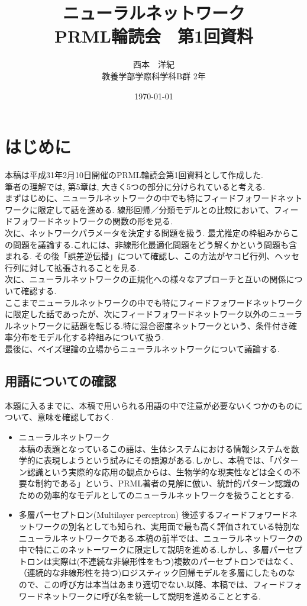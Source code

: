 \documentclass[11pt,a4paper]{jsarticle}
\begin{document}
\title{ニューラルネットワーク \\
PRML輪読会　第1回資料}
\author{西本　洋紀 \\
        教養学部学際科学科B群 2年
        }
\date{\today}
\maketitle
\section*{はじめに}
本稿は平成31年2月10日開催のPRML輪読会第1回資料として作成した. \\
筆者の理解では, 第5章は, 大きく5つの部分に分けられていると考える. \\
まずはじめに、ニューラルネットワークの中でも特にフィードフォワードネットワークに限定して話を進める. 線形回帰／分類モデルとの比較において、フィードフォワードネットワークの関数の形を見る.\\
次に、ネットワークパラメータを決定する問題を扱う. 最尤推定の枠組みからこの問題を議論する.これには、非線形化最適化問題をどう解くかという問題も含まれる. その後「誤差逆伝播」について確認し、この方法がヤコビ行列、ヘッセ行列に対して拡張されることを見る.\\
次に、ニューラルネットワークの正規化への様々なアプローチと互いの関係について確認する.\\
ここまでニューラルネットワークの中でも特にフィードフォワードネットワークに限定した話であったが、次にフィードフォワードネットワーク以外のニューラルネットワークに話題を転じる.特に混合密度ネットワークという、条件付き確率分布をモデル化する枠組みについて扱う.\\
最後に、ベイズ理論の立場からニューラルネットワークについて議論する.
\subsection*{用語についての確認}
本題に入るまでに、本稿で用いられる用語の中で注意が必要ないくつかのものについて、意味を確認しておく.
\begin{itemize}
  \item ニューラルネットワーク\\
  本稿の表題となっているこの語は、生体システムにおける情報システムを数学的に表現しようという試みにその語源がある.しかし、本稿では、「パターン認識という実際的な応用の観点からは、生物学的な現実性などは全くの不要な制約である」という、PRML著者の見解に倣い、統計的パターン認識のための効率的なモデルとしてのニューラルネットワークを扱うこととする.
  \item 多層パーセプトロン(Multilayer perceptron)
  後述するフィードフォワードネットワークの別名としても知られ、実用面で最も高く評価されている特別なニューラルネットワークである.本稿の前半では、ニューラルネットワークの中で特にこのネットーワークに限定して説明を進める.しかし、多層パーセプトロンは実際は(不連続な非線形性をもつ)複数のパーセプトロンではなく、（連続的な非線形性を持つ)ロジスティック回帰モデルを多層にしたものなので、この呼び方は本当はあまり適切でない.以降、本稿では、フィードフォワードネットワークに呼び名を統一して説明を進めることとする.

\end{itemize}
\end{document}
